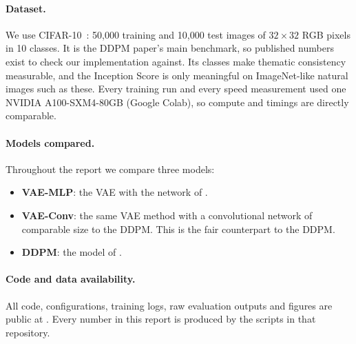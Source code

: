\paragraph{Dataset.} We use CIFAR-10~\citep{krizhevsky2009cifar}: 50,000 training and 10,000 test images of
$32\times32$ RGB pixels in 10 classes. It is the DDPM paper's main benchmark, so published numbers exist to check our
implementation against. Its classes make thematic consistency measurable, and the Inception Score is only
meaningful on ImageNet-like natural images such as these. Every training run and every speed measurement used one
NVIDIA A100-SXM4-80GB (Google Colab), so compute and timings are directly comparable.

\paragraph{Models compared.} Throughout the report we compare three models:
\begin{itemize}
  \item \textbf{VAE-MLP}: the VAE with the network of \citet{kingma2014vae}.
  \item \textbf{VAE-Conv}: the same VAE method with a convolutional network of comparable size to the DDPM. This
        is the fair counterpart to the DDPM.
  \item \textbf{DDPM}: the model of \citet{ho2020ddpm}.
\end{itemize}

\paragraph{Code and data availability.} All code, configurations, training logs, raw evaluation outputs and
figures are public at \repo. Every number in this report is produced by the scripts in that repository.
